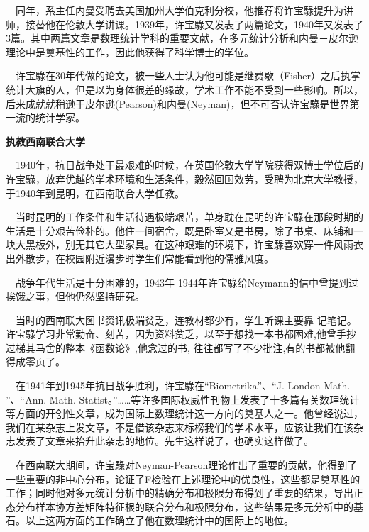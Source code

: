 \begin{frame}
	$\quad$同年，系主任内曼受聘去美国加州大学伯克利分校，他推荐将许宝騄提升为讲师，接替他在伦敦大学讲课。1939年，许宝騄又发表了两篇论文，1940年又发表了3篇。其中两篇文章是数理统计学科的重要文献，在多元统计分析和内曼－皮尔逊理论中是奠基性的工作，因此他获得了科学博士的学位。
	
	$\quad$许宝騄在30年代做的论文，被一些人士认为他可能是继费歇（Fisher）之后执掌统计大旗的人，但是以为身体很差的缘故，学术工作不能不受到一些影响。所以，后来成就就稍逊于皮尔逊(Pearson)和内曼(Neyman)，但不可否认许宝騄是世界第一流的统计学家。
\end{frame}	

\begin{frame}
	\textbf{执教西南联合大学}
	
	$\quad$1940年，抗日战争处于最艰难的时候，在英国伦敦大学学院获得双博士学位后的许宝騄，放弃优越的学术环境和生活条件，毅然回国效劳，受聘为北京大学教授，于1940年到昆明，在西南联合大学任教。
	
	$\quad$当时昆明的工作条件和生活待遇极端艰苦，单身耽在昆明的许宝騄在那段时期的生活是十分艰苦俭朴的。他住一间宿舍，既是卧室又是书房，除了书桌、床铺和一块大黑板外，别无其它大型家具。在这种艰难的环境下，许宝騄喜欢穿一件风雨衣出外散步，在校园附近漫步时学生们常能看到他的儒雅风度。
	
	$\quad$战争年代生活是十分困难的，1943年-1944年许宝騄给Neymann的信中曾提到过挨饿之事，但他仍然坚持研究。
	
\end{frame}

\begin{frame}
	$\quad$当时的西南联大图书资讯极端贫乏，连教材都少有，学生听课主要靠 记笔记。许宝騄学习非常勤奋、刻苦，因为资料贫乏，以至于想找一本书都困难,他曾手抄过梯其马舍的整本《函数论》,他念过的书, 往往都写了不少批注,有的书都被他翻得成零页了。
	
	$\quad$在1941年到1945年抗日战争胜利，许宝騄在“Biometrika”、“J. London Math. ”、“Ann. Math. Statist。”……等许多国际权威性刊物上发表了十多篇有关数理统计等方面的开创性文章，成为国际上数理统计这一方向的奠基人之一。他曾经说过，我们在某杂志上发文章，不是借该杂志来标榜我们的学术水平，应该让我们在该杂志发表了文章来抬升此杂志的地位。先生这样说了，也确实这样做了。
	
	$\quad$在西南联大期间，许宝騄对Neyman-Pearson理论作出了重要的贡献，他得到了一些重要的非中心分布，论证了F检验在上述理论中的优良性，这些都是奠基性的工作；同时他对多元统计分析中的精确分布和极限分布得到了重要的结果，导出正态分布样本协方差矩阵特征根的联合分布和极限分布，这些结果是多元分析中的基石。以上这两方面的工作确立了他在数理统计中的国际上的地位。　
\end{frame}

